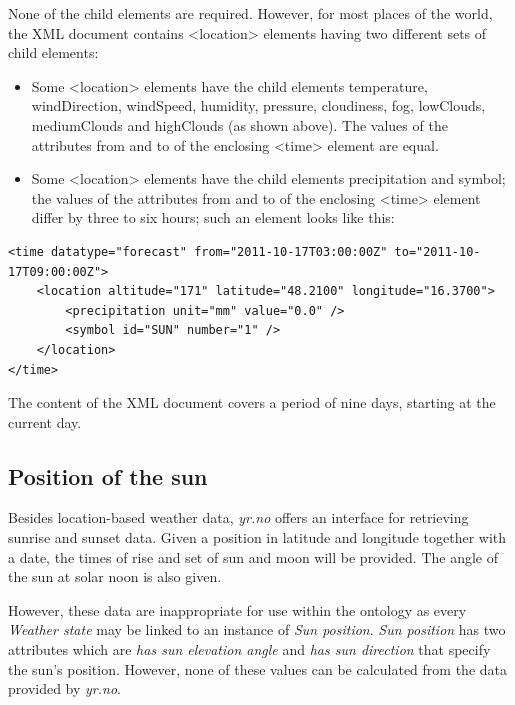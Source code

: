 None of the child elements are required. However, for most places of the world, the XML document contains <location> elements having two different sets of child elements:

\begin{itemize}
  \item Some <location> elements have the child elements temperature, windDirection, windSpeed, humidity, pressure, cloudiness, fog, lowClouds, mediumClouds and highClouds (as shown above). The values of the attributes from and to of the enclosing <time> element are equal.
  \item Some <location> elements have the child elements precipitation and symbol; the values of the attributes from and to of the enclosing <time> element differ by three to six hours; such an element looks like this:
\end{itemize}

\begin{lstlisting}
<time datatype="forecast" from="2011-10-17T03:00:00Z" to="2011-10-17T09:00:00Z">
	<location altitude="171" latitude="48.2100" longitude="16.3700">
		<precipitation unit="mm" value="0.0" />
		<symbol id="SUN" number="1" />
	</location>
</time>
\end{lstlisting}

The content of the XML document covers a period of nine days, starting at the current day.

\subsection{Position of the sun}
\label{subsec:sun_position}

Besides location-based weather data, \emph{yr.no} offers an interface for retrieving sunrise and sunset data. Given a position in latitude and longitude together with a date, the times of rise and set of sun and moon will be provided. The angle of the sun at solar noon is also given.

However, these data are inappropriate for use within the \thinkhomeweather ontology as every \emph{Weather state} may be linked to an instance of \emph{Sun position}. \emph{Sun position} has two attributes which are \emph{has sun elevation angle} and \emph{has sun direction} that specify the sun's position. However, none of these values can be calculated from the data provided by \emph{yr.no}.

